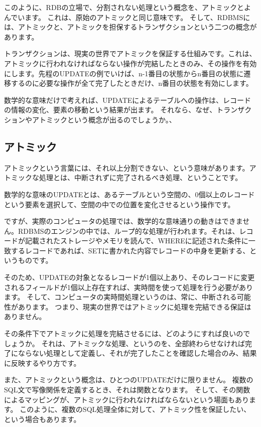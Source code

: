 このように、RDBの立場で、分割されない処理という概念を、アトミックとよんでいます。
これは、原始のアトミックと同じ意味です。
そして、RDBMSには、アトミックと、アトミックを担保するトランザクションという二つの概念があります。

トランザクションは、現実の世界でアトミックを保証する仕組みです。これは、アトミックに行われなければならない操作が完結したときのみ、その操作を有効にします。先程のUPDATEの例でいけば、n-1番目の状態からn番目の状態に遷移するのに必要な操作が全て完了したときだけ、n番目の状態を有効にします。

数学的な意味だけで考えれば、UPDATEによるテーブルへの操作は、レコードの情報の変化、要素の移動という結果が出ます。
それなら、なぜ、トランザクションやアトミックという概念が出るのでしょうか。、

\subsection{アトミック}
アトミックという言葉には、それ以上分割できない、という意味があります。アトミックな処理とは、中断されずに完了されるべき処理、ということです。

数学的な意味のUPDATEとは、あるテーブルという空間の、0個以上のレコードという要素を選択して、空間の中での位置を変化させるという操作です。

ですが、実際のコンピュータの処理では、数学的な意味通りの動きはできません。RDBMSのエンジンの中では、ループ的な処理が行われます。それは、レコードが記載されたストレージやメモリを読んで、WHEREに記述された条件に一致するレコードであれば、SETに書かれた内容でレコードの中身を更新する、というものです。

そのため、UPDATEの対象となるレコードが1個以上あり、そのレコードに変更されるフィールドが1個以上存在すれば、実時間を使って処理を行う必要があります。
そして、コンピュータの実時間処理というのは、常に、中断される可能性があります。
つまり、現実の世界ではアトミックに処理を完結できる保証はありません。

その条件下でアトミックに処理を完結させるには、どのようにすれば良いのでしょうか。
それは、アトミックな処理、というのを、全部終わらせなければ完了にならない処理として定義し、それが完了したことを確認した場合のみ、結果に反映するやり方です。

また、アトミックという概念は、ひとつのUPDATEだけに限りません。
複数のSQL文で写像関係を定義するとき、それは関数となります。
そして、その関数によるマッピングが、アトミックに行われなければならないという場面もあります。
このように、複数のSQL処理全体に対して、アトミック性を保証したい、という場合もあります。

